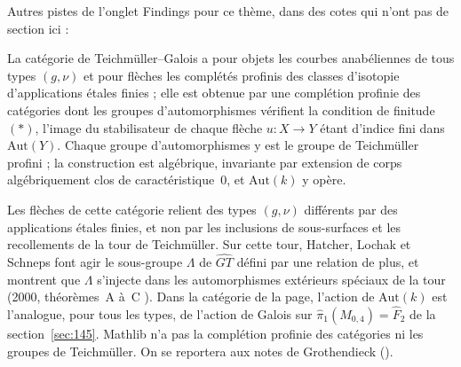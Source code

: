 \bigskip
\noindent Autres pistes de l'onglet Findings pour ce thème, dans des cotes qui n'ont pas de section ici :\par

\begin{encadre}
\begin{definition*}
La catégorie de Teichmüller--Galois a pour objets les courbes anabéliennes de tous types $(g, \nu)$ et pour flèches les complétés profinis des classes d'isotopie d'applications étales finies ; elle est obtenue par une complétion profinie des catégories dont les groupes d'automorphismes vérifient la condition de finitude $(\ast)$, l'image du stabilisateur de chaque flèche $u : X \to Y$ étant d'indice fini dans $\mathrm{Aut}(Y)$. Chaque groupe d'automorphismes y est le groupe de Teichmüller profini ; la construction est algébrique, invariante par extension de corps algébriquement clos de caractéristique~$0$, et $\mathrm{Aut}(k)$ y opère.
\end{definition*}
\end{encadre}
{\small Les flèches de cette catégorie relient des types $(g, \nu)$ différents par des applications étales finies, et non par les inclusions de sous-surfaces et les recollements de la tour de Teichmüller. Sur cette tour, Hatcher, Lochak et Schneps font agir le sous-groupe $\Lambda$ de $\widehat{GT}$ défini par une relation de plus, et montrent que $\Lambda$ s'injecte dans les automorphismes extérieurs spéciaux de la tour (2000, théorèmes~A à~C \cite{hatcherlochakschneps2000}). Dans la catégorie de la page, l'action de $\mathrm{Aut}(k)$ est l'analogue, pour tous les types, de l'action de Galois sur $\hat\pi_1(M_{0,4}) = \hat F_2$ de la section~\ref{sec:145}. Mathlib n'a pas la complétion profinie des catégories ni les groupes de Teichmüller. On se reportera aux notes de Grothendieck ().\par}

